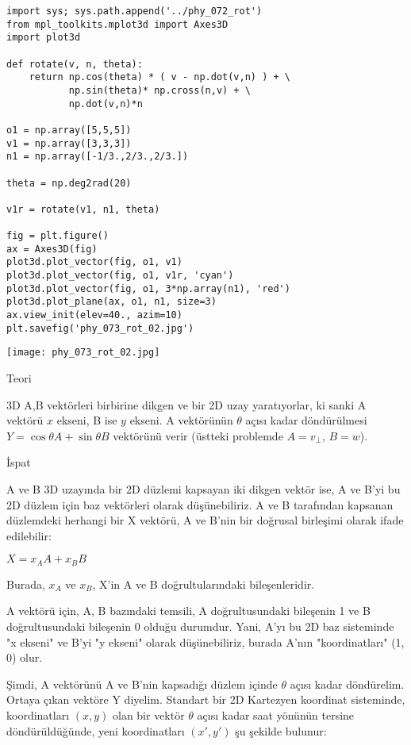 \documentclass[12pt,fleqn]{article}\usepackage{../../common}
\begin{document}
\begin{verbatim}
import sys; sys.path.append('../phy_072_rot')
from mpl_toolkits.mplot3d import Axes3D
import plot3d

def rotate(v, n, theta):
    return np.cos(theta) * ( v - np.dot(v,n) ) + \
           np.sin(theta)* np.cross(n,v) + \
           np.dot(v,n)*n
 
o1 = np.array([5,5,5])
v1 = np.array([3,3,3])
n1 = np.array([-1/3.,2/3.,2/3.])

theta = np.deg2rad(20)

v1r = rotate(v1, n1, theta)

fig = plt.figure()
ax = Axes3D(fig)
plot3d.plot_vector(fig, o1, v1)
plot3d.plot_vector(fig, o1, v1r, 'cyan')
plot3d.plot_vector(fig, o1, 3*np.array(n1), 'red')
plot3d.plot_plane(ax, o1, n1, size=3)
ax.view_init(elev=40., azim=10)
plt.savefig('phy_073_rot_02.jpg')
\end{verbatim}

\texttt{[image: phy\_073\_rot\_02.jpg]}

Teori

3D A,B vektörleri birbirine dikgen ve bir 2D uzay yaratıyorlar, ki sanki A
vektörü $x$ ekseni, B ise $y$ ekseni. A vektörünün $\theta$ açısı kadar
döndürülmesi $Y = \cos \theta A + \sin \theta B$ vektörünü verir (üstteki
problemde $A = v_\perp$, $B = w$).

İspat

A ve B 3D uzayında bir 2D düzlemi kapsayan iki dikgen vektör ise, A ve B'yi bu
2D düzlem için baz vektörleri olarak düşünebiliriz. A ve B tarafından kapsanan
düzlemdeki herhangi bir X vektörü, A ve B'nin bir doğrusal birleşimi olarak
ifade edilebilir:

$X = x_A A + x_B B$

Burada, $x_A$ ve $x_B$, X'in A ve B doğrultularındaki bileşenleridir.

A vektörü için, {A, B} bazındaki temsili, A doğrultusundaki bileşenin
1 ve B doğrultusundaki bileşenin 0 olduğu durumdur. Yani, A'yı bu 2D
baz sisteminde "x ekseni" ve B'yi "y ekseni" olarak düşünebiliriz,
burada A'nın "koordinatları" (1, 0) olur.

Şimdi, A vektörünü A ve B'nin kapsadığı düzlem içinde $\theta$ açısı
kadar döndürelim. Ortaya çıkan vektöre Y diyelim. Standart bir 2D
Kartezyen koordinat sisteminde, koordinatları $(x, y)$ olan bir vektör
$\theta$ açısı kadar saat yönünün tersine döndürüldüğünde, yeni
koordinatları $(x', y')$ şu şekilde bulunur:
\end{document}
